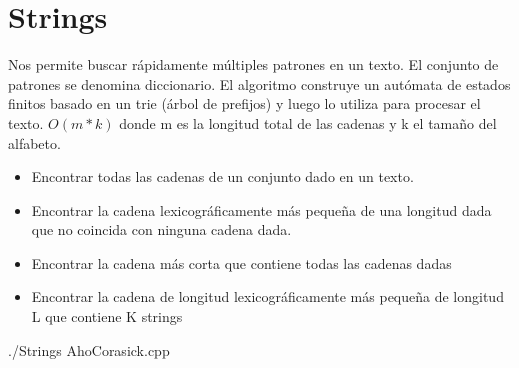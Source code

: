 \section{Strings}
\begin{multicols*}{2}
	{Nos permite buscar rápidamente múltiples patrones en un texto. El conjunto de patrones se denomina diccionario. El algoritmo construye un autómata de estados finitos basado en un trie (árbol de prefijos) y luego lo utiliza para procesar el texto.}
	{$O(m*k)$ donde m es la longitud total de las cadenas y k el tamaño del alfabeto.}
	{\begin{itemize}
			\item Encontrar todas las cadenas de un conjunto dado en un texto.
			\item Encontrar la cadena lexicográficamente más pequeña de una longitud dada que no coincida con ninguna cadena dada.
			\item Encontrar la cadena más corta que contiene todas las cadenas dadas
			\item Encontrar la cadena de longitud lexicográficamente más pequeña de longitud L que contiene K strings
		\end{itemize}}
	{./Strings}
	{AhoCorasick.cpp}
	
\end{multicols*}